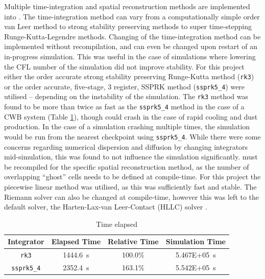 Multiple time-integration and spatial reconstruction methods are implemented into \athena{}.
The time-integration method can vary from a computationally simple  order van Leer \parencite{vanleerUltimateConservativeDifference1979} method to strong stability preserving methods \parencite{ruuthHighOrderStrongStabilityPreservingRungeKutta2005} to super time-stepping Runge-Kutta-Legendre \parencite{meyerStabilizedRungeKuttaLegendreMethod2014} methods.
Changing of the time-integration method can be implemented without recompilation, and can even be changed upon restart of an in-progress simulation.
This was useful in the case of simulations where lowering the CFL number of the simulation did not improve stability.
For this project either the  order accurate strong stability preserving Runge-Kutta method (\texttt{rk3}) or the  order accurate, five-stage, 3 register, SSPRK method (\texttt{ssprk5\_4}) were utilised -- depending on the instability of the simulation.
The \texttt{rk3} method was found to be more than twice as fast as the \texttt{ssprk5\_4} method in the case of a CWB system (Table \ref{tab:rkssprkcomparison}), though could crash in the case of rapid cooling and dust production.
In the case of a simulation crashing multiple times, the simulation would be run from the nearest checkpoint using \texttt{ssprk5\_4}.
While there were some concerns regarding numerical dispersion and diffusion by changing integrators mid-simulation, this was found to not influence the simulation significantly.
\athena{} must be recompiled for the specific spatial reconstruction method, as the number of overlapping ``ghost'' cells needs to be defined at compile-time.
For this project the piecewise linear method was utilised, as this was sufficiently fast and stable.
The Riemann solver can also be changed at compile-time, however this was left to the default solver, the Harten-Lax-van Leer-Contact (HLLC) solver \parencite{toroRestorationContactSurface1994}.

\begin{table}[h]
  \centering
  \begin{tabular}{cccc}
  \hline
  Integrator & Elapsed Time & Relative Time & Simulation Time \\ \hline
  \texttt{rk3}       & \SI{1444.6}{\second} & 100.0\% & \SI{5.467E+05}{\second}\\
  \texttt{ssprk5\_4} & \SI{2352.4}{\second} & 163.1\% & \SI{5.542E+05}{\second}\\ \hline
  \end{tabular}
  \caption{Time elapsed}
  \label{tab:rkssprkcomparison}
\end{table}


